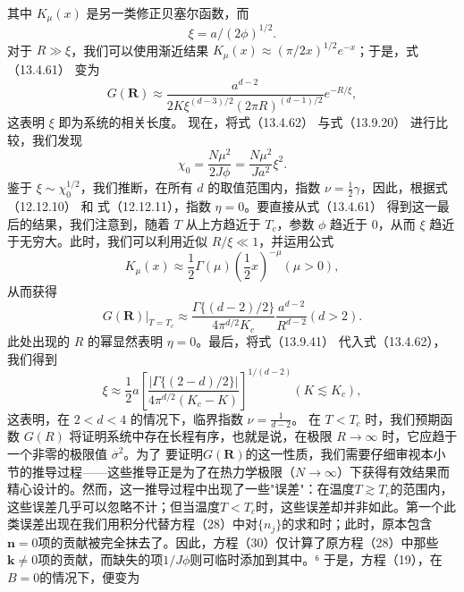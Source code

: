 其中 \(K_{\mu}(x)\) 是另一类修正贝塞尔函数，而
\begin{equation}\tag{13.4.95}\label{eq:13.4.95}
\xi = a / ( 2 \phi ) ^{1 / 2} .
\end{equation}
对于 \(R \gg \xi\)，我们可以使用渐近结果 \(K_{\mu}(x) \approx (\pi/2x)^{1/2}e^{-x}\)；于是，式（13.4.61） 变为
\begin{equation}\tag{13.4.96}\label{eq:13.4.96}
G ( \mathbf { R } ) \approx \frac { a ^{d - 2} } { 2 K \xi ^{( d - 3 ) / 2} ( 2 \pi R ) ^{( d - 1 ) / 2} } e ^{- R / \xi} ,
\end{equation}
这表明 \(\xi\) 即为系统的相关长度。
现在，将式（13.4.62） 与式（13.9.20） 进行比较，我们发现
\begin{equation}\tag{13.4.97}\label{eq:13.4.97}
\chi _ { 0 } = \frac { N \mu ^{2} } { 2 J \phi } = \frac { N \mu ^{2} } { J a ^{2} } \xi ^{2} .
\end{equation}
鉴于 \(\xi \sim \chi_{0}^{1/2}\)，我们推断，在所有 \(d\) 的取值范围内，指数 \(\nu = \frac{1}{2}\gamma\)，因此，根据式（12.12.10） 和 式（12.12.11），指数 \(\eta = 0\)。要直接从式（13.4.61） 得到这一最后的结果，我们注意到，随着 \(T\) 从上方趋近于 \(T_{c}\)，参数 \(\phi\) 趋近于 \(0\)，从而 \(\xi\) 趋近于无穷大。此时，我们可以利用近似 \(R/\xi \ll 1\)，并运用公式
\begin{equation}\tag{13.4.98}\label{eq:13.4.98}
K _ { \mu } ( x ) \approx \frac { 1 } { 2 } \Gamma ( \mu ) \left( \frac { 1 } { 2 } x \right) ^{- \mu}  ( \mu > 0 ) ,
\end{equation}
从而获得
\begin{equation}\tag{13.4.99}\label{eq:13.4.99}
G ( \pmb { R } ) | _ { T = T _ { c } } \approx \frac { \Gamma \{ ( d - 2 ) / 2 \} } { 4 \pi ^{d / 2} K _ { c } } \frac { a ^{d - 2} } { R ^{d - 2} }  ( d > 2 ) .
\end{equation}
此处出现的 \(R\) 的幂显然表明 \(\eta=0\)。最后，将式（13.9.41） 代入式（13.4.62），我们得到
\begin{equation}\tag{13.4.100}\label{eq:13.4.100}
\xi \approx \frac { 1 } { 2 } a \left[ \frac { | \Gamma \{ ( 2 - d ) / 2 \} | } { 4 \pi ^{d / 2} ( K _ { c } - K ) } \right] ^{1 / ( d - 2 )}  ( K \lesssim K _ { c } ) ,
\end{equation}
这表明，在 \(2 < d < 4\) 的情况下，临界指数 \(\nu = \frac{1}{d - 2}\)。
在 \(T < T_{c}\) 时，我们预期函数 \(G(R)\) 将证明系统中存在长程有序，也就是说，在极限 \(R \rightarrow \infty\) 时，它应趋于一个非零的极限值 \(\overline{\sigma}^{2}\)。为了
要证明\(G(\boldsymbol{R})\)的这一性质，我们需要仔细审视本小节的推导过程——这些推导正是为了在热力学极限（\(N \rightarrow \infty\)）下获得有效结果而精心设计的。然而，这一推导过程中出现了一些"误差"：在温度\(T \gtrsim T_{c}\)的范围内，这些误差几乎可以忽略不计；但当温度\(T < T_{c}\)时，这些误差却并非如此。第一个此类误差出现在我们用积分代替方程（28）中对\(\{n_{j}\}\)的求和时；此时，原本包含\(\boldsymbol{n} = 0\)项的贡献被完全抹去了。因此，方程（30）仅计算了原方程（28）中那些\(\boldsymbol{k} \neq 0\)项的贡献，而缺失的项\(1/J\phi\)则可临时添加到其中。⁶ 于是，方程（19），在\(B = 0\)的情况下，便变为
